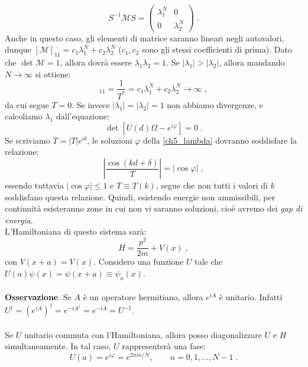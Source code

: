 \documentclass[10pt,a4paper]{report}
\theoremstyle{definition}
\numberwithin{equation}{section}
\newcommand{\adj}[1]{#1^{\dagger}}
\begin{document}
\begin{equation}
S^{-1}\mathcal{M}S=\left(\begin{matrix}
\lambda_1^N & 0 \\
0 & \lambda_2^N
\end{matrix}\right)\;.
\end{equation}
Anche in questo caso, gli elementi di matrice saranno lineari negli autovalori, dunque $[\mathcal{M}]_{11}=c_1\lambda_1^N+c_2\lambda_2^N$ ($c_1,c_2$ sono gli stessi coefficienti di prima). Dato che $\det\mathcal{M}=1$, allora dovrà essere $\lambda_1\lambda_2=1$. Se $|\lambda_1|>|\lambda_2|$, allora mandando $N\to\infty$ si ottiene:
\begin{equation}
[\mathcal{M}]_{11}=\frac{1}{T^*}=c_1\lambda_1^N+c_2\lambda_2^N\to\infty\;,
\end{equation}
da cui segue $T=0$. Se invece $|\lambda_1|=|\lambda_2|=1$ non abbiamo divergenze, e calcoliamo $\lambda_1$ dall'equazione:
\begin{equation}
\det\left[U(d)\Omega-e^{i\varphi}\right]=0\;. \label{ch5_lambda}
\end{equation}
Se scriviamo $T=|T|e^{i\delta}$, le soluzioni $\varphi$ della \eqref{ch5_lambda} dovranno soddisfare la relazione:
\begin{equation}
\left|\frac{\cos(kd+\delta)}{T}\right|=|\cos\varphi|\;,
\end{equation}
essendo tuttavia $|\cos\varphi|\le 1$ e $T\equiv T(k)$, segue che non tutti i valori di $k$ soddisfano questa relazione. Quindi, esistendo energie non ammissibili, per continuità esisteranno zone in cui non vi saranno soluzioni, cioè avremo dei \textit{gap di energia}. \\
L'Hamiltoniana di questo sistema sarà:
\begin{equation}
H=\frac{p^2}{2m}+V(x)\;,
\end{equation}
con $V(x+a)=V(x)$. Considero una funzione $U$ tale che $U(a)\psi(x)=\psi(x+a)\equiv\psi_a(x)$. \\
\\
\textbf{Osservazione}. Se $A$ è un operatore hermitiano, allora $e^{iA}$ è unitario. Infatti $\adj{U}=\adj{(e^{iA})}=e^{-i\adj{A}}=e^{-iA}=U^{-1}$. \\
\\
Se $U$ unitario commuta con l'Hamiltoniana, allora posso diagonalizzare $U$ e $H$ simultaneamente. In tal caso, $U$ rappresenterà una fase:
\begin{equation}
U(a)=e^{i\varphi}=e^{2\pi in/N},\qquad n=0,1,\ldots,N-1\;.
\end{equation}
\end{document}
